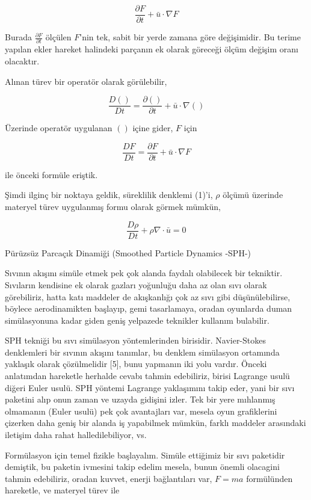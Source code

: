 \documentclass[12pt,fleqn]{article}\usepackage{../../common}
\begin{document}
$$
\frac{\partial F}{\partial t} + \bar{u} \cdot \nabla F
$$

Burada $\frac{\partial F}{\partial t}$ ölçülen $F$'nin tek, sabit bir yerde
zamana göre değişimidir. Bu terime yapılan ekler hareket halindeki parçanın ek
olarak göreceği ölçüm değişim oranı olacaktır.

Alınan türev bir operatör olarak görülebilir, 

$$
\frac{D ()}{D t} = \frac{\partial () }{\partial t} + \bar{u} \cdot \nabla ()
$$

Üzerinde operatör uygulanan $()$ içine gider, $F$ için

$$
\frac{D F}{D t} = \frac{\partial F}{\partial t} + \bar{u} \cdot \nabla F
$$

ile önceki formüle eriştik.

Şimdi ilginç bir noktaya geldik, süreklilik denklemi (1)'i, $\rho$ ölçümü
üzerinde materyel türev uygulanmış formu olarak görmek mümkün,

$$
\frac{D \rho}{D t} + \rho \nabla \cdot \bar{u} = 0
$$

Pürüzsüz Parcaçık Dinamiği (Smoothed Particle Dynamics -SPH-)

Sıvının akışını simüle etmek pek çok alanda faydalı olabilecek bir
tekniktir. Sıvıların kendisine ek olarak gazları yoğunluğu daha az olan sıvı
olarak görebiliriz, hatta katı maddeler de akışkanlığı çok az sıvı gibi
düşünülebilirse, böylece aerodinamikten başlayıp, gemi tasarlamaya, oradan
oyunlarda duman simülasyonuna kadar giden geniş yelpazede teknikler kullanım
bulabilir.

SPH tekniği bu sıvı simülasyon yöntemlerinden birisidir. Navier-Stokes
denklemleri bir sıvının akışını tanımlar, bu denklem simülasyon ortamında
yaklaşık olarak çözülmelidir [5], bunu yapmanın iki yolu vardır. Önceki
anlatımdan hareketle herhalde cevabı tahmin edebiliriz, birisi Lagrange usulü
diğeri Euler usulü. SPH yöntemi Lagrange yaklaşımını takip eder, yani bir sıvı
paketini alıp onun zaman ve uzayda gidişini izler. Tek bir yere mıhlanmış
olmamanın (Euler usulü) pek çok avantajları var, mesela oyun grafiklerini
çizerken daha geniş bir alanda iş yapabilmek mümkün, farklı maddeler arasındaki
iletişim daha rahat halledilebiliyor, vs.

Formülasyon için temel fizikle başlayalım. Simüle ettiğimiz bir sıvı paketidir
demiştik, bu paketin ivmesini takip edelim mesela, bunun önemli olacagini tahmin
edebiliriz, oradan kuvvet, enerji bağlantıları var, $F=ma$ formülünden
hareketle, ve materyel türev ile
\end{document}
